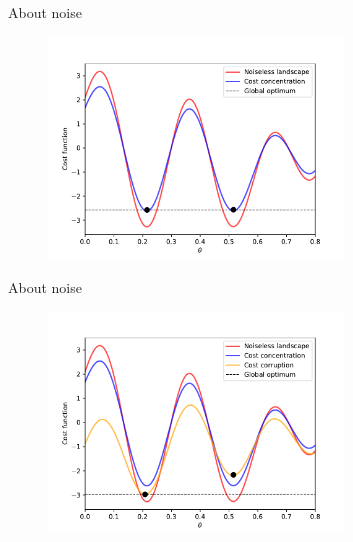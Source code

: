 \documentclass[8pt, xcolor={svgnames}, hyperref={linkcolor=black}, aspectratio=169]{beamer}
\begin{document}
\begin{frame}{About noise}
\begin{figure}
\includegraphics[width=0.7\textwidth]{figures/conc.pdf}
\end{figure}
\end{frame}

\begin{frame}{About noise}
\begin{figure}
\includegraphics[width=0.7\textwidth]{figures/corr.pdf}
\end{figure}
\end{frame}
\end{document}
